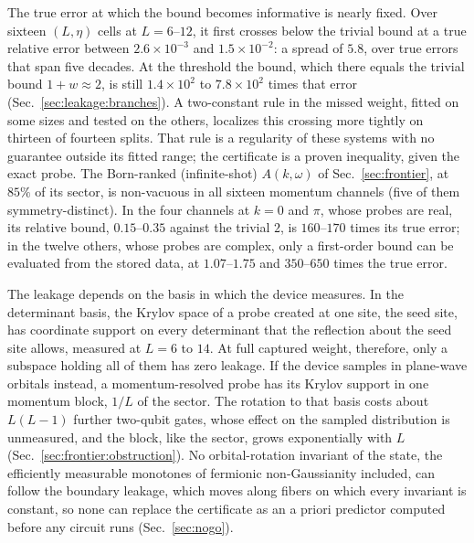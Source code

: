 The true error at which the bound becomes informative is nearly fixed. Over sixteen $(L,\eta)$
cells at $L=6$--$12$, it first crosses below the trivial bound at a true relative error between
$2.6\times10^{-3}$ and $1.5\times10^{-2}$: a spread of $5.8$, over true errors that span five
decades. At the threshold the bound, which there equals the trivial bound $1+w\approx2$, is still
$1.4\times10^{2}$ to $7.8\times10^{2}$ times that error (Sec.~\ref{sec:leakage:branches}). A
two-constant rule in the missed weight, fitted on some sizes and tested on the others, localizes this
crossing more tightly on thirteen of fourteen splits. That rule is a regularity of these systems
with no guarantee outside its fitted range; the certificate is a proven inequality, given the exact
probe. The Born-ranked (infinite-shot) $A(k,\omega)$ of Sec.~\ref{sec:frontier}, at $85\%$ of its
sector, is non-vacuous in all sixteen momentum channels (five of them symmetry-distinct). In the four
channels at $k=0$ and $\pi$, whose probes are real, its relative bound, $0.15$--$0.35$ against the trivial $2$,
is $160$--$170$ times its true error; in the twelve others, whose probes are complex, only a first-order
bound can be evaluated from the stored data, at $1.07$--$1.75$ and $350$--$650$ times the true error.

The leakage depends on the basis in which the device measures. In the determinant basis, the Krylov
space of a probe created at one site, the seed site, has coordinate support on every determinant
that the reflection about the seed site allows, measured at $L=6$ to $14$. At full captured weight,
therefore, only a subspace holding all of them has zero leakage. If the device samples in
plane-wave orbitals instead, a momentum-resolved probe has its Krylov support in one momentum block,
$1/L$ of the sector. The rotation to that basis costs about $L(L-1)$ further two-qubit gates, whose
effect on the sampled distribution is unmeasured, and the block, like the sector, grows
exponentially with $L$
(Sec.~\ref{sec:frontier:obstruction}). No orbital-rotation invariant of the state, the efficiently
measurable monotones of fermionic non-Gaussianity included, can follow the boundary leakage, which
moves along fibers on which every invariant is constant, so none can replace the certificate as an a
priori predictor computed before any circuit runs (Sec.~\ref{sec:nogo}).

